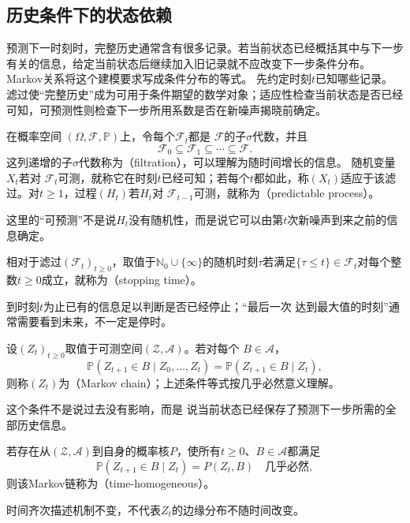 \subsection{历史条件下的状态依赖}

预测下一时刻时，完整历史通常含有很多记录。若当前状态已经概括其中与下一步有关的信息，给定当前状态后继续加入旧记录就不应改变下一步条件分布。Markov关系将这个建模要求写成条件分布的等式。
\label{sec:rv-markov}
\label{sec:stoch-martingales-stopping-sequential-concentration}
先约定时刻\(t\)已知哪些记录。滤过使“完整历史”成为可用于条件期望的数学对象；适应性检查当前状态是否已经可知，可预测性则检查下一步所用系数是否在新噪声揭晓前确定。
\begin{definition}[滤过、适应与可预测性]
  \label{def:stoch-filtration-adaptation-predictability}
在概率空间
$(\Omega,\mathcal{F},\mathbb{P})$上，令每个$\mathcal{F}_t$都是
$\mathcal{F}$的子$\sigma$代数，并且
\[
  \mathcal{F}_0\subseteq\mathcal{F}_1\subseteq\cdots\subseteq\mathcal{F}.
\]
这列递增的子$\sigma$代数称为（filtration），可以理解为随时间增长的信息。
随机变量$X_t$若对
$\mathcal{F}_t$可测，就称它在时刻$t$已经可知；若每个$t$都如此，称$(X_t)$适应于该滤过。对$t\geq1$，过程$(H_t)$若$H_t$对
$\mathcal{F}_{t-1}$可测，就称为（predictable process）。
\end{definition}
这里的“可预测”不是说$H_t$没有随机性，而是说它可以由第$t$次新噪声到来之前的信息确定。
\begin{definition}[停时]
  \label{def:stoch-stopping-time}
  相对于滤过\((\mathcal F_t)_{t\geq0}\)，取值于\(\mathbb N_0\cup\{\infty\}\)的随机时刻$\tau$若满足$\{\tau\leq t\}\in\mathcal{F}_t$对每个整数$t\geq0$成立，就称为（stopping time）。
\end{definition}
到时刻$t$为止已有的信息足以判断是否已经停止；“最后一次
达到最大值的时刻”通常需要看到未来，不一定是停时。


\begin{definition}[Markov链]
  \label{def:stoch-markov-chain}
设$(Z_t)_{t\geq0}$取值于可测空间$(\mathcal{Z},\mathcal{A})$。若对每个
$B\in\mathcal{A}$，
\[
  \mathbb{P}(Z_{t+1}\in B\mid Z_0,\ldots,Z_t)
  =
  \mathbb{P}(Z_{t+1}\in B\mid Z_t),
\]
则称$(Z_t)$为（Markov chain）；上述条件等式按几乎必然意义理解。
\end{definition}
这个条件不是说过去没有影响，而是
说当前状态已经保存了预测下一步所需的全部历史信息。
\begin{definition}[时间齐次Markov链]
  \label{def:stoch-time-homogeneous-chain}
  若存在从\((\mathcal Z,\mathcal A)\)到自身的概率核\(P\)，使所有\(t\geq0\)、\(B\in\mathcal A\)都满足
  \[ \mathbb P(Z_{t+1}\in B\mid Z_t)=P(Z_t,B)\quad\text{几乎必然}, \]
  则该Markov链称为（time-homogeneous）。
\end{definition}
时间齐次描述机制不变，不代表$Z_t$的边缘分布不随时间改变。

